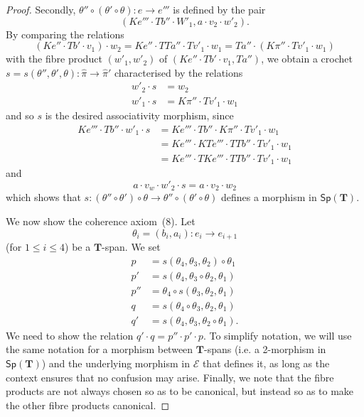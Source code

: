 \documentclass[fleqn]{article}
\newcommand{\oldpage}[1]{\marginpar{\footnotesize$\Big\vert$ \textit{p.~#1}}}
\newcommand{\TT}{\mathbf{T}}
\newcommand{\cat}[1]{\mathcal{#1}}
\newcommand{\Cat}[1]{\mathsf{#1}}
\newcommand{\Sp}[1]{\Cat{Sp}(#1)}
\begin{document}
\begin{proof}
  \oldpage{251}
  Secondly, $\theta''\circ(\theta'\circ\theta)\colon e\to e'''$ is defined by the pair
  \[
    (Ke'''\cdot Tb''\cdot W'_1,
    a\cdot v_2\cdot w'_2).
  \]
  By comparing the relations
  \[
    (Ke''\cdot Tb'\cdot v_1)\cdot w_2
    = Ke''\cdot TTa''\cdot Tv'_1\cdot w_1
    = Ta''\cdot(K\pi''\cdot Tv'_1\cdot w_1)
  \]
  with the fibre product $(w'_1,w'_2)$ of $(Ke''\cdot Tb'\cdot v_1, Ta'')$, we obtain a crochet $s=s(\theta'',\theta',\theta)\colon\hat{\pi}\to\hat{\pi}'$ characterised by the relations
  \[
    \begin{aligned}
      w'_2\cdot s
      &= w_2
    \\w'_1\cdot s
      &= K\pi''\cdot Tv'_1\cdot w_1
    \end{aligned}
  \]
  and so $s$ is the desired associativity morphism, since
  \[
    \begin{aligned}
      Ke'''\cdot Tb''\cdot w'_1\cdot s
      &= Ke'''\cdot Tb''\cdot K\pi''\cdot Tv'_1\cdot w_1
    \\&=Ke'''\cdot KTe'''\cdot TTb''\cdot Tv'_1\cdot w_1
    \\&= Ke'''\cdot TKe'''\cdot TTb''\cdot Tv'_1\cdot w_1
    \end{aligned}
  \]
  and
  \[
    a\cdot v_w\cdot w'_2\cdot s
    = a\cdot v_2\cdot w_2
  \]
  which shows that $s\colon(\theta''\circ\theta')\circ\theta\to\theta''\circ(\theta'\circ\theta)$ defines a morphism in $\Sp{\TT}$.

  We now show the coherence axiom~(8).
  Let
  \[
    \theta_i
    = (b_i,a_i)
    \colon e_i
    \to e_{i+1}
  \]
  (for $1\leqslant i\leqslant 4$) be a $\TT$-span.
  We set
  \[
    \begin{aligned}
      p
      &= s(\theta_4,\theta_3,\theta_2)\circ\theta_1
    \\p'
      &= s(\theta_4,\theta_3\circ\theta_2,\theta_1)
    \\p''
      &= \theta_4\circ s(\theta_3,\theta_2,\theta_1)
    \\q
      &= s(\theta_4\circ\theta_3,\theta_2,\theta_1)
    \\q'
      &= s(\theta_4,\theta_3,\theta_2\circ\theta_1).
    \end{aligned}
  \]
  We need to show the relation $q'\cdot q=p''\cdot p'\cdot p$.
  To simplify notation, we will use the same notation for a morphism between $\TT$-spans (i.e. a 2-morphism in $\Sp{\TT}$) and the underlying morphism in $\cat{E}$ that defines it, as long as the context ensures that no confusion may arise.
  Finally, we note that the fibre products are not always chosen so as to be canonical, but instead so as to make the other fibre products canonical.


\end{proof}
\end{document}
